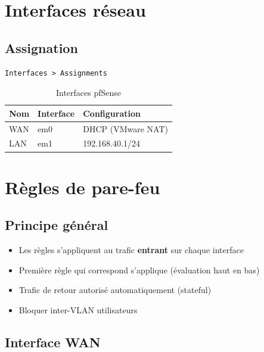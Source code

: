 \section{Interfaces réseau}

\subsection{Assignation}

\begin{lstlisting}
Interfaces > Assignments
\end{lstlisting}

\begin{table}[H]
    \centering
    \begin{tabularx}{\textwidth}{|l|p{2cm}|p{4cm}|}
        \hline
        \textbf{Nom} & \textbf{Interface} & \textbf{Configuration} \\
        \hline
        WAN & em0 & DHCP (VMware NAT) \\
        \hline
        LAN & em1 & 192.168.40.1/24 \\
        \hline
    \end{tabularx}
    \caption{Interfaces pfSense}
    \label{tab:pfsense-interfaces}
\end{table}

\section{Règles de pare-feu}

\subsection{Principe général}

\begin{itemize}
    \item Les règles s'appliquent au trafic \textbf{entrant} sur chaque interface
    \item Première règle qui correspond s'applique (évaluation haut en bas)
    \item Trafic de retour autorisé automatiquement (stateful)
    \item Bloquer inter-VLAN utilisateurs
\end{itemize}

\subsection{Interface WAN}

